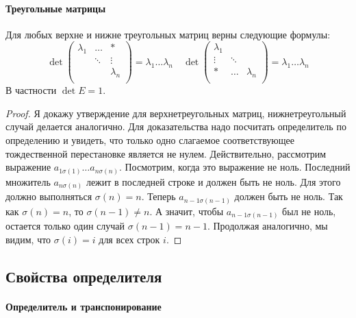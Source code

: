 \paragraph{Треугольные матрицы}

\begin{claim}
\label{claim::DetUpperTr}
Для любых верхне и нижне треугольных матриц верны следующие формулы:
\[
\det
\begin{pmatrix}
{\lambda_1}&{\ldots}&{*}\\
{}&{\ddots}&{\vdots}\\
{}&{}&{\lambda_n}\\
\end{pmatrix}
 = 
\lambda_1 \ldots \lambda_n
\quad
\det
\begin{pmatrix}
{\lambda_1}&{}&{}\\
{\vdots}&{\ddots}&{}\\
{*}&{\ldots}&{\lambda_n}\\
\end{pmatrix}
 = 
 \lambda_1 \ldots \lambda_n
\]
В частности $\det E = 1$.
\end{claim}
\begin{proof}
Я докажу утверждение для верхнетреугольных матриц, нижнетреугольный случай делается аналогично.
Для доказательства надо посчитать определитель по определению и увидеть, что только одно слагаемое соответствующее тождественной перестановке является не нулем.
Действительно, рассмотрим выражение $a_{1\sigma(1)}\ldots a_{n\sigma(n)}$.
Посмотрим, когда это выражение не ноль.
Последний множитель $a_{n\sigma(n)}$ лежит в последней строке и должен быть не ноль.
Для этого должно выполняться $\sigma(n) = n$.
Теперь $a_{n-1\sigma(n-1)}$ должен быть не ноль.
Так как $\sigma(n) = n$, то $\sigma(n - 1)\neq n$.
А значит, чтобы $a_{n-1 \sigma(n-1)}$ был не ноль, остается только один случай $\sigma(n-1) = n-1$.
Продолжая аналогично, мы видим, что $\sigma(i) = i$ для всех строк $i$.
\end{proof}

\subsection{Свойства определителя}

\paragraph{Определитель и транспонирование}

